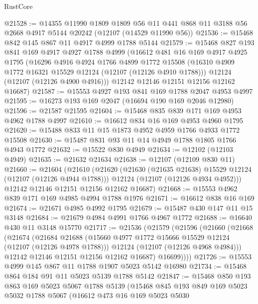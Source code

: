 \begin{lexlean}{RustCore}
\begin{coremodule}
@21528 := @14355
    @11990
    @1809
    @1809
    @56
    @11
    @441
    @868
    @11
    @3188
    @56
    @2668
    @4917
    @5144
    @20242
    (@12107 (@14529 @11990 @56))
@21536 := @15468 @842 @145 @867 @11 @4917 @4999 @1788 @5144
@21579 := @15468
    @827
    @193
    @841
    @169
    @4917
    @4927
    @1788
    @4999
    (@16612
      @481
      @16
      @169
      @4917
      @4925
      @1795
      (@16296
        @4916
        @4924
        @1766
        @4899
        @1772
        @15508
        (@16310 @4909 @1772 @16321 @15529 @12124 (@12107 (@12126 @4910 @1788)))
        @12124
        (@12107 (@12126 @4900 @4916)))
      @12142
      @12146
      @12151
      @12156
      @12162
      @16687)
@21587 := @15553 @4927 @193 @841 @169 @1788 @2047 @4953 @4997
@21595 := @16273 @193 @169 @2047 (@16694 @190 @169 @2046 @12980)
@21596 := @21587 @21595
@21604 := @15468 @835 @839 @171 @169 @4953 @4962 @1788 @4997
@21610 := @16612 @834 @16 @169 @4953 @4960 @1795
@21620 := @15488 @833 @11 @15 @1873 @4952 @4959 @1766 @4933 @1772 @15508
@21630 := @15487 @831 @93 @11 @14 @4949 @1788 @1805 @1766 @4943 @1772
@21632 := @15522 @830 @4949
@21634 := @12102 (@12103 @4949)
@21635 := @21632 @21634
@21638 := @12107 (@12109 @830 @11)
@21660 := @21604
    (@21610
      (@21620
        (@21630 (@21635 @21638) @15529 @12124 (@12107 (@12126 @4944 @1788)))
        @12124
        (@12107 (@12126 @4934 @4952)))
      @12142
      @12146
      @12151
      @12156
      @12162
      @16687)
@21668 := @15553 @4962 @839 @171 @169 @4985 @4994 @1788 @1976
@21671 := @16612 @838 @16 @169
@21674 := @21671 @4985 @4992 @1795
@21679 := @15487 @430 @147 @11 @15 @3148
@21684 := @21679 @4984 @4991 @1766 @4967 @1772
@21688 := @16640 @430 @11 @3148 @15770
@21717 := @21536
    (@21579
      (@21596
        (@21660
          (@21668
            (@21674
              (@21684
                @21688
                (@15660 @4977 @1772 @15666 @15529 @12124 (@12107 (@12126 @4978 @1788)))
                @12124
                (@12107 (@12126 @4968 @4984)))
              @12142
              @12146
              @12151
              @12156
              @12162
              @16687)
            @16699))))
@21726 := @15553 @4999 @145 @867 @11 @1788 @1907 @5023 @5142 @16980
@21734 := @15468 @864 @184 @91 @11 @5023 @5139 @1788 @5142
@21847 := @15468
    @850
    @193
    @863
    @169
    @5023
    @5067
    @1788
    @5139
    (@15468
      @845
      @193
      @849
      @169
      @5023
      @5032
      @1788
      @5067
      (@16612
        @473
        @16
        @169
        @5023
        @5030

\end{coremodule}
\end{lexlean}
